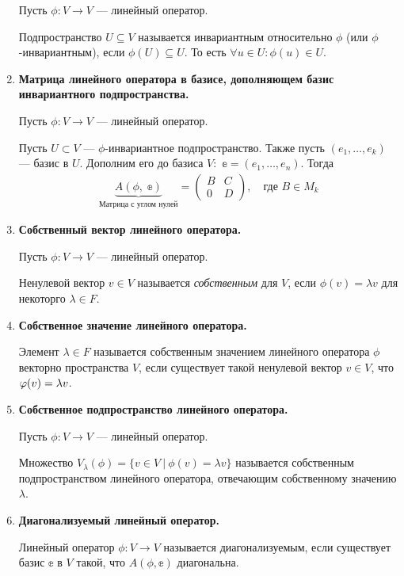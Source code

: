 \begin{enumerate}
Пусть $\phi\colon V \rightarrow V$ --- линейный оператор.

Подпространство $U \subseteq V$ называется инвариантным относительно $\phi$ (или $\phi$-инвариантным), если $\phi(U)\subseteq U$. То есть $\forall u\in U \colon \phi(u)\in U$. 

\item \textbf{Матрица линейного оператора в базисе, дополняющем базис инвариантного подпространства.}

Пусть $\phi\colon V \rightarrow V$ --- линейный оператор.

Пусть $U\subset V$ --- $\phi$-инвариантное подпространство. Также пусть $(e_1, \ldots, e_k)$ --- базис в $U$. Дополним его до базиса $V\colon$ $\mathbb{e} = (e_1, \ldots, e_n)$. Тогда
\begin{gather}
    \underbrace{A(\phi,\;\mathbb{e})}_{\text{Матрица с углом нулей}} = \begin{pmatrix}
    B& C \\
    0& D
    \end{pmatrix}, \quad\text{где $B\in M_k$}
\end{gather}

\item \textbf{Собственный вектор линейного оператора.}

Пусть $\phi\colon V \rightarrow V$ --- линейный оператор.

Ненулевой вектор $v\in V$ называется \textit{собственным} для $V$, если $\phi(v) = \lambda v$ для некоторго $\lambda \in F$.

\item \textbf{Собственное значение линейного оператора.}

Элемент $\lambda \in F$ называется собственным значением линейного оператора $\phi$ векторно пространства $V$, если существует такой ненулевой вектор $v \in V$, что $\varphi(v) = \lambda v$. 

\item \textbf{Собственное подпространство линейного оператора.}

Пусть $\phi\colon V \rightarrow V$ --- линейный оператор.

Множество $V_{\lambda}(\phi) = \{v\in V\ |\ \phi(v) = \lambda v\}$ называется собственным подпространством линейного оператора, отвечающим собственному значению $\lambda$.

\item \textbf{Диагонализуемый линейный оператор.}

Линейный оператор $\phi\colon V \rightarrow V$ называется диагонализуемым, если существует базис $\mathbb{e}$ в $V$ такой, что $A(\phi, \mathbb{e})$ диагональна. 


\end{enumerate}
